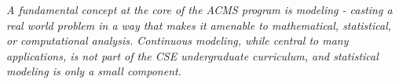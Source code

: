 
{\em A fundamental concept at the core of the ACMS program is modeling - casting a real world problem in a way that makes it amenable to mathematical, statistical, or computational analysis. 
 Continuous modeling, while central to many applications, is not part of the CSE undergraduate curriculum, and statistical modeling is only a small component. }